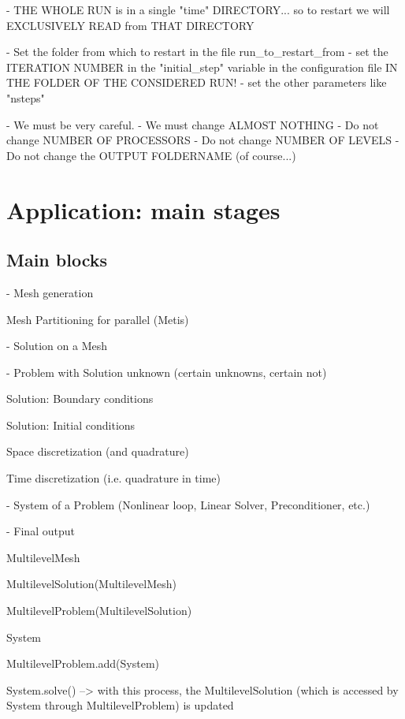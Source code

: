 \documentclass[10pt]{book}
\begin{document}
- THE WHOLE RUN is in a single "time" DIRECTORY...
  so to restart we will EXCLUSIVELY READ from THAT DIRECTORY

- Set the folder from which to restart in the file run\_to\_restart\_from
- set the ITERATION NUMBER in the "initial\_step" variable in the configuration file IN THE FOLDER OF THE CONSIDERED RUN!
- set the other parameters like "nsteps"

- We must be very careful.
- We must change ALMOST NOTHING
- Do not change NUMBER OF PROCESSORS
- Do not change NUMBER OF LEVELS
- Do not change the OUTPUT FOLDERNAME (of course...)



\part{Application: main stages}

  
   \chapter{Main blocks}


 
 - Mesh generation
 
   Mesh Partitioning for parallel (Metis)
 
 - Solution on a Mesh

 - Problem with Solution unknown (certain unknowns, certain not)
 
 Solution: Boundary conditions
 
 Solution: Initial conditions
 
 Space discretization (and quadrature)
 
 Time discretization (i.e. quadrature in time)
 
 - System of a Problem (Nonlinear loop, Linear Solver, Preconditioner, etc.)
 
 - Final output
 
 
 
 

  
  MultilevelMesh
  
  MultilevelSolution(MultilevelMesh)
  
   MultilevelProblem(MultilevelSolution)

   System
   
   MultilevelProblem.add(System)
   
   System.solve() --> with this process, the MultilevelSolution (which is accessed by System through MultilevelProblem) is updated
   
\end{document}
